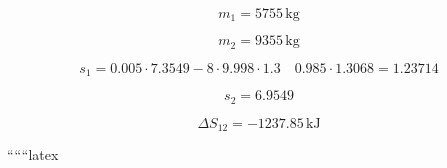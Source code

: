 \begin{equation*}
m_1 = 5755 \, \text{kg}
\end{equation*}

\begin{equation*}
m_2 = 9355 \, \text{kg}
\end{equation*}

\begin{equation*}
s_1 = 0.005 \cdot 7.3549 - 8 \cdot 9.998 \cdot 1.3 \quad 0.985 \cdot 1.3068 = 1.23714
\end{equation*}

\begin{equation*}
s_2 = 6.9549
\end{equation*}

\begin{equation*}
\Delta S_{12} = -1237.85 \, \text{kJ}
\end{equation*}

``````latex



